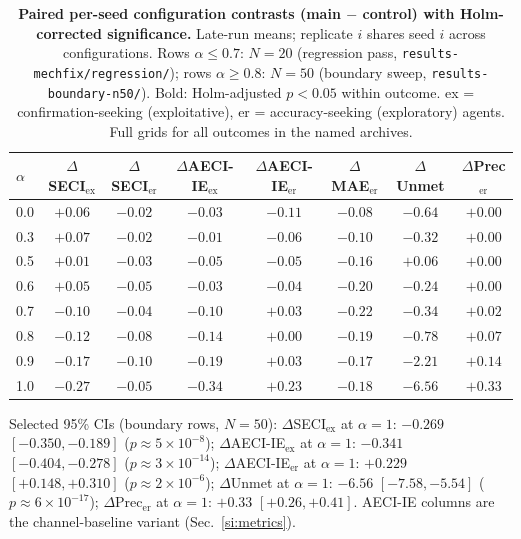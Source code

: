 \documentclass[11pt]{article}
\begin{document}
\begin{table}[h!]
\centering
\caption{\textbf{Paired per-seed configuration contrasts (main $-$
control) with Holm-corrected significance.} Late-run means; replicate
$i$ shares seed $i$ across configurations. Rows $\alpha \leq 0.7$: $N =
20$ (regression pass, \texttt{results-mechfix/regression/}); rows
$\alpha \geq 0.8$: $N = 50$ (boundary sweep,
\texttt{results-boundary-n50/}). Bold: Holm-adjusted $p < 0.05$ within
outcome. ex = confirmation-seeking (exploitative), er =
accuracy-seeking (exploratory) agents. Full grids for all outcomes in
the named archives.}\label{tab:s1-deltas}
\small
\begin{tabular}{@{}lccccccc@{}}
\toprule
$\alpha$ & $\Delta$SECI$_{\mathrm{ex}}$ & $\Delta$SECI$_{\mathrm{er}}$ & $\Delta$AECI-IE$_{\mathrm{ex}}$ & $\Delta$AECI-IE$_{\mathrm{er}}$ & $\Delta$MAE$_{\mathrm{er}}$ & $\Delta$Unmet & $\Delta$Prec$_{\mathrm{er}}$ \\
\midrule
0.0 & $+0.06$ & $-0.02$ & $-0.03$ & $\mathbf{-0.11}$ & $\mathbf{-0.08}$ & $-0.64$ & $+0.00$ \\
0.3 & $+0.07$ & $-0.02$ & $-0.01$ & $\mathbf{-0.06}$ & $\mathbf{-0.10}$ & $-0.32$ & $+0.00$ \\
0.5 & $+0.01$ & $-0.03$ & $-0.05$ & $\mathbf{-0.05}$ & $\mathbf{-0.16}$ & $+0.06$ & $+0.00$ \\
0.6 & $+0.05$ & $-0.05$ & $-0.03$ & $-0.04$ & $\mathbf{-0.20}$ & $-0.24$ & $+0.00$ \\
0.7 & $-0.10$ & $-0.04$ & $-0.10$ & $+0.03$ & $\mathbf{-0.22}$ & $-0.34$ & $\mathbf{+0.02}$ \\
\midrule
0.8 & $\mathbf{-0.12}$ & $\mathbf{-0.08}$ & $\mathbf{-0.14}$ & $+0.00$ & $\mathbf{-0.19}$ & $\mathbf{-0.78}$ & $\mathbf{+0.07}$ \\
0.9 & $\mathbf{-0.17}$ & $\mathbf{-0.10}$ & $\mathbf{-0.19}$ & $+0.03$ & $\mathbf{-0.17}$ & $\mathbf{-2.21}$ & $\mathbf{+0.14}$ \\
1.0 & $\mathbf{-0.27}$ & $-0.05$ & $\mathbf{-0.34}$ & $\mathbf{+0.23}$ & $\mathbf{-0.18}$ & $\mathbf{-6.56}$ & $\mathbf{+0.33}$ \\
\bottomrule
\end{tabular}

\medskip
\footnotesize
Selected 95\% CIs (boundary rows, $N=50$): $\Delta$SECI$_{\mathrm{ex}}$
at $\alpha=1$: $-0.269$ $[-0.350, -0.189]$ ($p \approx 5\times10^{-8}$);
$\Delta$AECI-IE$_{\mathrm{ex}}$ at $\alpha=1$: $-0.341$
$[-0.404, -0.278]$ ($p \approx 3\times10^{-14}$);
$\Delta$AECI-IE$_{\mathrm{er}}$ at $\alpha=1$: $+0.229$
$[+0.148, +0.310]$ ($p \approx 2\times10^{-6}$); $\Delta$Unmet at
$\alpha=1$: $-6.56$ $[-7.58, -5.54]$ ($p \approx 6\times10^{-17}$);
$\Delta$Prec$_{\mathrm{er}}$ at $\alpha=1$: $+0.33$ $[+0.26, +0.41]$.
AECI-IE columns are the channel-baseline variant
(Sec.~\ref{si:metrics}).
\end{table}
\end{document}
